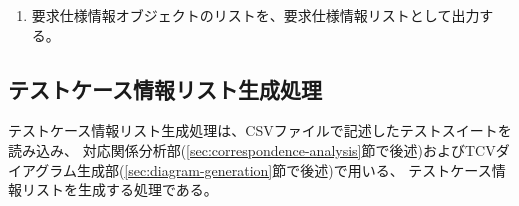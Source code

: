 \begin{enumerate}
\begin{enumerate}
\begin{itemize}
\begin{enumerate}
                具体的には、子要求仕様情報オブジェクトのparent\_idプロパティに親要求仕様情報オブジェクトのidプロパティの値を代入し、親要求仕様情報オブジェクトのchildren\_idsプロパティのリストに子要求仕様情報オブジェクトのidプロパティの値を追加する。
                表\ref{tb:hierarchy_example}の例では、``REQ-1-1-1''のparent\_idは``REQ-1-1''であり、``REQ-1-1''のchildren\_idsは``REQ-1-1-1''を含む。
            \end{enumerate}
        \end{itemize}
    \end{enumerate}
    \item 要求仕様情報オブジェクトのリストを、要求仕様情報リストとして出力する。
\end{enumerate}

\subsection{テストケース情報リスト生成処理}\label{sec:testcase-data-extraction}
テストケース情報リスト生成処理は、CSVファイルで記述したテストスイートを読み込み、
対応関係分析部(\ref{sec:correspondence-analysis}節で後述)およびTCVダイアグラム生成部(\ref{sec:diagram-generation}節で後述)で用いる、
テストケース情報リストを生成する処理である。

